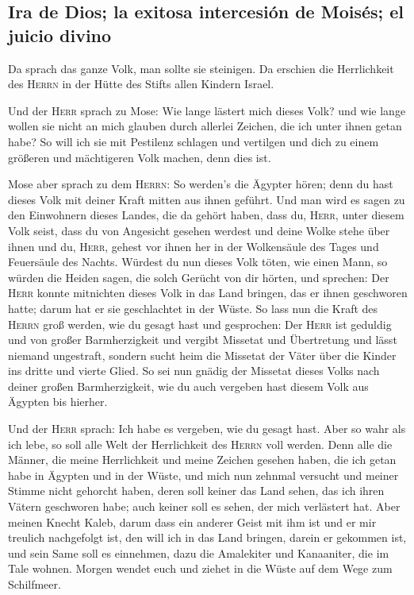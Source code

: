 \hypertarget{ira-de-dios-la-exitosa-intercesiuxf3n-de-moisuxe9s-el-juicio-divino}{%
\subsection{Ira de Dios; la exitosa intercesión de Moisés; el juicio
divino}\label{ira-de-dios-la-exitosa-intercesiuxf3n-de-moisuxe9s-el-juicio-divino}}

 Da sprach das ganze Volk, man sollte sie steinigen. Da
erschien die Herrlichkeit des \textsc{Herrn} in der Hütte des Stifts
allen Kindern Israel.

 Und der \textsc{Herr} sprach zu Mose: Wie lange lästert
mich dieses Volk? und wie lange wollen sie nicht an mich glauben durch
allerlei Zeichen, die ich unter ihnen getan habe?  So
will ich sie mit Pestilenz schlagen und vertilgen und dich zu einem
größeren und mächtigeren Volk machen, denn dies ist.

 Mose aber sprach zu dem \textsc{Herrn}: So werden's die
Ägypter hören; denn du hast dieses Volk mit deiner Kraft mitten aus
ihnen geführt.  Und man wird es sagen zu den Einwohnern
dieses Landes, die da gehört haben, dass du, \textsc{Herr}, unter diesem
Volk seist, dass du von Angesicht gesehen werdest und deine Wolke stehe
über ihnen und du, \textsc{Herr}, gehest vor ihnen her in der
Wolkensäule des Tages und Feuersäule des Nachts.  Würdest
du nun dieses Volk töten, wie einen Mann, so würden die Heiden sagen,
die solch Gerücht von dir hörten, und sprechen:  Der
\textsc{Herr} konnte mitnichten dieses Volk in das Land bringen, das er
ihnen geschworen hatte; darum hat er sie geschlachtet in der Wüste.
 So lass nun die Kraft des \textsc{Herrn} groß werden,
wie du gesagt hast und gesprochen:  Der \textsc{Herr} ist
geduldig und von großer Barmherzigkeit und vergibt Missetat und
Übertretung und lässt niemand ungestraft, sondern sucht heim die
Missetat der Väter über die Kinder ins dritte und vierte Glied.
 So sei nun gnädig der Missetat dieses Volks nach deiner
großen Barmherzigkeit, wie du auch vergeben hast diesem Volk aus Ägypten
bis hierher.

 Und der \textsc{Herr} sprach: Ich habe es vergeben, wie
du gesagt hast.  Aber so wahr als ich lebe, so soll alle
Welt der Herrlichkeit des \textsc{Herrn} voll werden. 
Denn alle die Männer, die meine Herrlichkeit und meine Zeichen gesehen
haben, die ich getan habe in Ägypten und in der Wüste, und mich nun
zehnmal versucht und meiner Stimme nicht gehorcht haben, 
deren soll keiner das Land sehen, das ich ihren Vätern geschworen habe;
auch keiner soll es sehen, der mich verlästert hat.  Aber
meinen Knecht Kaleb, darum dass ein anderer Geist mit ihm ist und er mir
treulich nachgefolgt ist, den will ich in das Land bringen, darein er
gekommen ist, und sein Same soll es einnehmen,  dazu die
Amalekiter und Kanaaniter, die im Tale wohnen. Morgen wendet euch und
ziehet in die Wüste auf dem Wege zum Schilfmeer.

